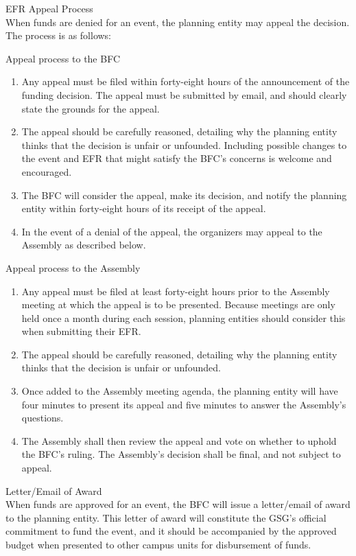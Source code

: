 \begin{bylaws-number}
  \item EFR Appeal Process \hfill \\
When funds are denied for an event, the planning entity may appeal the decision. The process is as follows:
\begin{bylaws-number}
  \item Appeal process to the BFC
\begin{enumerate}[i]
  \item Any appeal must be filed within forty-eight hours of the announcement of the funding decision. The appeal must be submitted by email, and should clearly state the grounds for the appeal.
  \item The appeal should be carefully reasoned, detailing why the planning entity thinks that the decision is unfair or unfounded. Including possible changes to the event and EFR that might satisfy the BFC’s concerns is welcome and encouraged.
  \item The BFC will consider the appeal, make its decision, and notify the planning entity within forty-eight hours of its receipt of the appeal.
  \item In the event of a denial of the appeal, the organizers may appeal to the Assembly as described below.
\end{enumerate}
  \item Appeal process to the Assembly
\begin{enumerate}[i]
  \item Any appeal must be filed at least forty-eight hours prior to the Assembly meeting at which the appeal is to be presented. Because meetings are only held once a month during each session, planning entities should consider this when submitting their EFR.
  \item The appeal should be carefully reasoned, detailing why the planning entity thinks that the decision is unfair or unfounded.
  \item Once added to the Assembly meeting agenda, the planning entity will have four minutes to present its appeal and five minutes to answer the Assembly’s questions.
  \item The Assembly shall then review the appeal and vote on whether to uphold the BFC’s ruling. The Assembly’s decision shall be final, and not subject to appeal.
\end{enumerate}
\end{bylaws-number}
  \item Letter/Email of Award \hfill \\
When funds are approved for an event, the BFC will issue a letter/email of award to the planning entity. This letter of award will constitute the GSG’s official commitment to fund the event, and it should be accompanied by the approved budget when presented to other campus units for disbursement of funds.

\end{bylaws-number}
